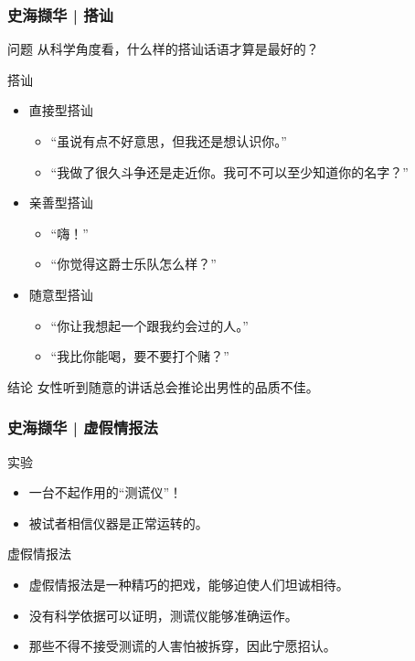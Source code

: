 \begin{frame}
  \frametitle{史海撷华 | 搭讪}
  \begin{block}{问题}
    从科学角度看，什么样的搭讪话语才算是最好的？
  \end{block}
  \vspace{-0.5em}
  \pause
  \begin{block}{搭讪}
    \begin{itemize}
      \item 直接型搭讪
        \begin{itemize}
          \item “虽说有点不好意思，但我还是想认识你。”
          \item “我做了很久斗争还是走近你。我可不可以至少知道你的名字？”
        \end{itemize}
      \item 亲善型搭讪
        \begin{itemize}
          \item “嗨！”
          \item “你觉得这爵士乐队怎么样？”
        \end{itemize}
      \item 随意型搭讪
        \begin{itemize}
          \item “你让我想起一个跟我约会过的人。”
          \item “我比你能喝，要不要打个赌？”
        \end{itemize}
    \end{itemize}
  \end{block}
  \vspace{-0.5em}
  \pause
  \begin{block}{结论}
    女性听到随意的讲话总会推论出男性的品质不佳。
  \end{block}
\end{frame}

\begin{frame}
  \frametitle{史海撷华 | 虚假情报法}
  \begin{block}{实验}
    \begin{itemize}
      \item 一台不起作用的“测谎仪”！
      \item 被试者相信仪器是正常运转的。
    \end{itemize}
  \end{block}
  \pause
  \begin{block}{虚假情报法}
    \begin{itemize}
      \item 虚假情报法是一种精巧的把戏，能够迫使人们坦诚相待。
      \item 没有科学依据可以证明，测谎仪能够准确运作。
      \item 那些不得不接受测谎的人害怕被拆穿，因此宁愿招认。
    \end{itemize}
  \end{block}
\end{frame}

